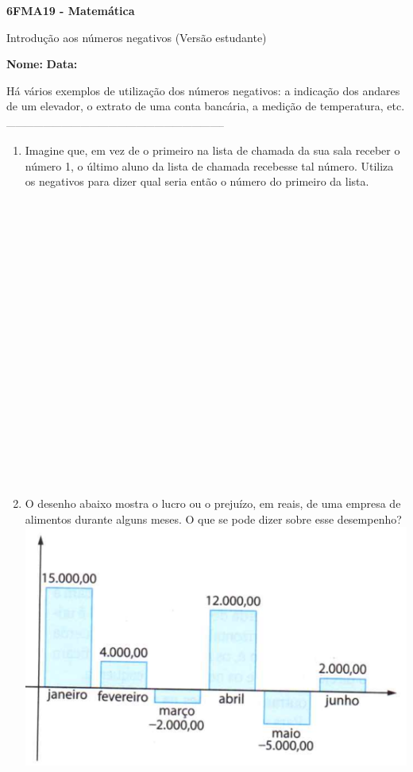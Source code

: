 \documentclass[a4paper,14pt]{article}
\begin{document}
	
	\noindent\textbf{6FMA19 - Matemática} 
	
	\begin{center}Introdução aos números negativos (Versão estudante)
	\end{center}
	
	\noindent\textbf{Nome:} \underline{\hspace{10cm}}
	\noindent\textbf{Data:} \underline{\hspace{4cm}}
	
	
	\begin{multicols}{2}
		\noindent Há vários exemplos de utilização dos números negativos: a indicação dos andares de um elevador, o extrato de uma conta bancária, a medição de temperatura, etc.
		\noindent\textsubscript{-----------------------------------------------------------------------}
		\begin{enumerate} 
			\item Imagine que, em vez de o primeiro na lista de chamada da sua sala receber o número 1, o último aluno da lista de chamada recebesse tal número. Utiliza os negativos para dizer qual seria então o número do primeiro da lista. \\\\\\\\\\\\\\\\\\\\\\\\\\\\\\\\\\\\\\\\
			\item O desenho abaixo mostra o lucro ou o prejuízo, em reais, de uma empresa de alimentos durante alguns meses. O que se pode dizer sobre esse desempenho? \\
			\includegraphics[width=1\linewidth]{6FMA19_imagens/imagem1} \newpage

\end{enumerate}
\end{multicols}
\end{document}
